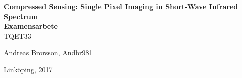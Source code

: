 	 



\begin{titlepage}
		\begin{center}
			
			{\LARGE\bfseries Compressed Sensing: Single Pixel Imaging in Short-Wave Infrared Spectrum \\[0.4in] \Large Examensarbete}\\ \medskip TQET33 \medskip  \\ 
			\vspace{2\baselineskip}
			
			Andreas Brorsson, Andbr981\\
			
			\vspace{2\baselineskip}
			
			Linköping, 2017
			
		\end{center}
\end{titlepage}		


\begin{flushleft}

% 
 
\newpage	
\tableofcontents
\newpage
 
\newpage		

\newpage
%

%
%
%
%
%
\newpage

\end{flushleft}


\newpage
\printbibliography


